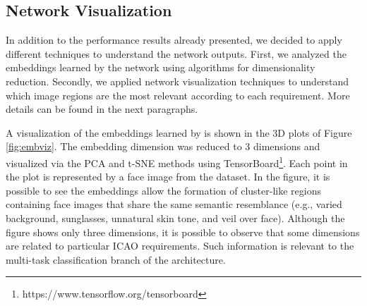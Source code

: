 \subsection{Network Visualization} \label{sec:netviz}

In addition to the performance results already presented, we decided to apply different techniques to understand the network outputs. First, we analyzed the embeddings learned by the network using algorithms for dimensionality reduction. Secondly, we applied network visualization techniques to understand which image regions are the most relevant according to each requirement. More details can be found in the next paragraphs.

A visualization of the embeddings learned by \methodname is shown in the 3D plots of Figure \ref{fig:embviz}. The embedding dimension was reduced to 3 dimensions and visualized via the PCA \citep{pca} and t-SNE \citep{tsne} methods using TensorBoard\footnote{https://www.tensorflow.org/tensorboard}. Each point in the plot is represented by a face image from the dataset. In the figure, it is possible to see the embeddings allow the formation of cluster-like regions containing face images that share the same semantic resemblance (e.g., varied background, sunglasses, unnatural skin tone, and veil over face). Although the figure shows only three dimensions, it is possible to observe that some dimensions are related to particular ICAO requirements. Such information is relevant to the multi-task classification branch of the \methodname architecture. 

